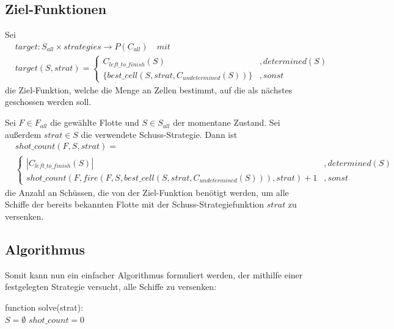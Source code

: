 \documentclass[a4paper,12pt]{llncs}
\numberwithin{equation}{section}
\begin{document}
\subsection{Ziel-Funktionen}

\begin{definition}
Sei
\begin{align}
&target:S_{all} \times strategies \rightarrow P(C_{all}) \quad mit \nonumber\\
&target(S,strat)=
\begin{cases}
C_{left\_to\_finish}(S)&, determined(S) \\
\{best\_cell(S, strat, C_{undetermined}(S))\}&, sonst
\end{cases}
\nonumber
\end{align}
die Ziel-Funktion, welche die Menge an Zellen bestimmt, auf die als nächstes geschossen werden soll.
\end{definition}


\begin{definition}
Sei $F\in F_{all}$ die gewählte Flotte und $S\in S_{all}$ der momentane Zustand.
Sei außerdem $strat \in S$ die verwendete Schuss-Strategie.
Dann ist
\begin{align}
&shot\_count(F, S, strat)=\\
& \begin{cases} 
  	|C_{left\_to\_finish}(S)|& ,determined(S) \\
      shot\_count(F, fire(F, S, best\_cell(S, strat, C_{undetermined}(S))), strat) + 1 & ,sonst
   \end{cases}
\nonumber
\end{align}
die Anzahl an Schüssen, die von der Ziel-Funktion benötigt werden, um alle Schiffe der bereits bekannten Flotte mit der Schuss-Strategiefunktion $strat$ zu versenken.
\end{definition}

\subsection{Algorithmus}

Somit kann nun ein einfacher Algorithmus formuliert werden, der mithilfe einer festgelegten Strategie versucht, alle Schiffe zu versenken:

\begin{algorithm}[H]
 function solve(strat):\\
 $S=\emptyset$\;
 $shot\_count=0$\;
\end{algorithm}
\end{document}

